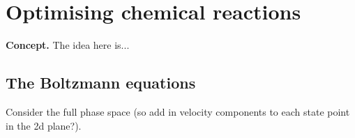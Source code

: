 \chapter{\sffamily Optimising chemical reactions}

{\bfseries\sffamily Concept.} The idea here is... 


\section{\sffamily The Boltzmann equations}

Consider the full phase space (so add in velocity components to each state point in the 2d plane?).